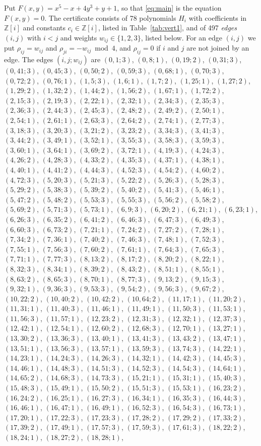 \documentclass[11pt]{article}
\newcommand{\Z}{\mathbb{Z}}
\begin{document}
Put $F(x,y)=x^{5}-x+4y^{3}+y+1$, so that \eqref{eq:main} is the equation $F(x,y)=0$. The certificate consists of 78 polynomials $H_i$ with coefficients in $\Z[i]$ and constants $c_i\in\Z[i]$, listed in Table~\ref{tab:vert1}, and of 497 \emph{edges} $(i,j)$ with $i<j$ and weights $w_{ij}\in\{1,2,3\}$, listed below. For an edge $(i,j)$ we put $\rho_{ij}=w_{ij}$ and $\rho_{ji}=-w_{ij}\bmod 4$, and $\rho_{ij}=0$ if $i$ and $j$ are not joined by an edge.
The edges $(i,j;w_{ij})$ are $(0,1;3)$, $(0,8;1)$, $(0,19;2)$, $(0,31;3)$, $(0,41;3)$, $(0,45;3)$, $(0,50;2)$, $(0,59;3)$, $(0,68;1)$, $(0,70;3)$, $(0,72;2)$, $(0,76;1)$, $(1,5;3)$, $(1,6;1)$, $(1,7;2)$, $(1,25;1)$, $(1,27;2)$, $(1,29;2)$, $(1,32;2)$, $(1,44;2)$, $(1,56;2)$, $(1,67;1)$, $(1,72;2)$, $(2,15;3)$, $(2,19;3)$, $(2,22;1)$, $(2,32;1)$, $(2,34;3)$, $(2,35;3)$, $(2,36;3)$, $(2,44;3)$, $(2,45;3)$, $(2,48;2)$, $(2,49;2)$, $(2,50;1)$, $(2,54;1)$, $(2,61;1)$, $(2,63;3)$, $(2,64;2)$, $(2,74;1)$, $(2,77;3)$, $(3,18;3)$, $(3,20;3)$, $(3,21;2)$, $(3,23;2)$, $(3,34;3)$, $(3,41;3)$, $(3,44;2)$, $(3,49;1)$, $(3,52;1)$, $(3,55;3)$, $(3,58;3)$, $(3,59;3)$, $(3,60;1)$, $(3,64;1)$, $(3,69;2)$, $(3,72;1)$, $(4,19;3)$, $(4,24;3)$, $(4,26;2)$, $(4,28;3)$, $(4,33;2)$, $(4,35;3)$, $(4,37;1)$, $(4,38;1)$, $(4,40;1)$, $(4,41;2)$, $(4,44;3)$, $(4,52;3)$, $(4,54;2)$, $(4,60;2)$, $(4,72;3)$, $(5,20;3)$, $(5,21;3)$, $(5,22;2)$, $(5,26;3)$, $(5,28;3)$, $(5,29;2)$, $(5,38;3)$, $(5,39;2)$, $(5,40;2)$, $(5,41;3)$, $(5,46;1)$, $(5,47;2)$, $(5,48;2)$, $(5,53;3)$, $(5,55;3)$, $(5,56;2)$, $(5,58;2)$, $(5,69;2)$, $(5,71;3)$, $(5,73;1)$, $(6,9;3)$, $(6,20;2)$, $(6,21;1)$, $(6,23;1)$, $(6,26;3)$, $(6,35;2)$, $(6,41;2)$, $(6,46;3)$, $(6,47;3)$, $(6,49;3)$, $(6,60;3)$, $(6,73;2)$, $(7,21;1)$, $(7,24;2)$, $(7,27;2)$, $(7,28;1)$, $(7,34;2)$, $(7,36;1)$, $(7,40;2)$, $(7,46;3)$, $(7,48;1)$, $(7,52;3)$, $(7,55;1)$, $(7,56;3)$, $(7,60;2)$, $(7,61;1)$, $(7,64;3)$, $(7,65;3)$, $(7,71;1)$, $(7,77;3)$, $(8,13;2)$, $(8,17;2)$, $(8,20;2)$, $(8,22;1)$, $(8,32;3)$, $(8,34;1)$, $(8,39;2)$, $(8,43;2)$, $(8,51;1)$, $(8,55;1)$, $(8,63;2)$, $(8,65;3)$, $(8,70;1)$, $(8,77;3)$, $(9,13;2)$, $(9,15;3)$, $(9,32;1)$, $(9,36;3)$, $(9,53;3)$, $(9,54;2)$, $(9,56;3)$, $(9,67;2)$, $(10,22;2)$, $(10,40;2)$, $(10,42;2)$, $(10,64;2)$, $(11,17;1)$, $(11,20;2)$, $(11,31;1)$, $(11,40;3)$, $(11,46;1)$, $(11,49;1)$, $(11,50;3)$, $(11,53;1)$, $(11,56;3)$, $(11,57;1)$, $(12,23;2)$, $(12,31;3)$, $(12,32;1)$, $(12,37;3)$, $(12,42;1)$, $(12,54;1)$, $(12,60;2)$, $(12,68;3)$, $(12,70;1)$, $(13,27;1)$, $(13,30;2)$, $(13,36;3)$, $(13,40;1)$, $(13,41;3)$, $(13,43;2)$, $(13,47;1)$, $(13,51;1)$, $(13,56;3)$, $(13,57;1)$, $(13,59;3)$, $(13,74;3)$, $(14,22;1)$, $(14,23;1)$, $(14,24;3)$, $(14,26;3)$, $(14,32;1)$, $(14,42;3)$, $(14,45;3)$, $(14,46;1)$, $(14,48;3)$, $(14,51;3)$, $(14,52;3)$, $(14,54;3)$, $(14,64;1)$, $(14,65;2)$, $(14,68;3)$, $(14,73;3)$, $(15,21;1)$, $(15,31;1)$, $(15,40;3)$, $(15,48;3)$, $(15,49;1)$, $(15,50;2)$, $(15,51;3)$, $(15,53;1)$, $(16,23;2)$, $(16,24;2)$, $(16,25;1)$, $(16,27;3)$, $(16,34;1)$, $(16,35;3)$, $(16,44;3)$, $(16,46;1)$, $(16,47;1)$, $(16,49;1)$, $(16,52;3)$, $(16,54;3)$, $(16,73;1)$, $(17,20;1)$, $(17,22;3)$, $(17,23;3)$, $(17,28;2)$, $(17,29;2)$, $(17,33;2)$, $(17,39;2)$, $(17,49;1)$, $(17,57;3)$, $(17,59;3)$, $(17,61;3)$, $(18,22;2)$, $(18,24;1)$, $(18,27;2)$, $(18,28;1)$, 
\end{document}
